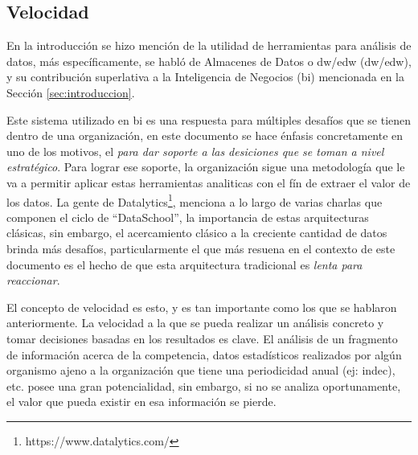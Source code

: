 \subsection{Velocidad} \label{ssec:velocidad}

En la introducción se hizo mención de la utilidad de herramientas para
análisis de datos, más específicamente, se habló de Almacenes de Datos o 
\acrlong{dw}/\acrlong{edw} (\acrshort{dw}/\acrshort{edw}), y su contribución
superlativa a la Inteligencia de Negocios (\acrshort{bi}) mencionada en la
Sección \ref{sec:introduccion}.

Este sistema utilizado en \acrshort{bi} es una respuesta para múltiples
desafíos que se tienen dentro de una organización\cite{datalytics2}, en este
documento se hace énfasis concretamente en uno de los motivos, el 
\textit{para dar soporte a las desiciones que se toman a nivel estratégico}.
Para lograr ese soporte, la organización 
sigue una metodología que le va a permitir aplicar estas herramientas
analiticas con el fín de extraer el valor de los datos. La gente de
Datalytics\footnote{https://www.datalytics.com/}, menciona a lo largo de varias
charlas que componen el ciclo de ``DataSchool'', la importancia de estas
arquitecturas clásicas, sin embargo, el acercamiento clásico a la creciente
cantidad de datos brinda más desafíos, particularmente el que más resuena en el
contexto de este documento es el hecho de que esta arquitectura tradicional es 
\textit{lenta para reaccionar}\cite{datalytics3}.

El concepto de velocidad es esto, y es tan importante como los que se hablaron
anteriormente. La velocidad a la que se pueda realizar un análisis concreto y
tomar decisiones basadas en los resultados es clave. El análisis de un
fragmento de información acerca de la competencia, datos estadísticos realizados
por algún organismo ajeno a la organización que tiene una periodicidad anual
(ej: \acrshort{indec}), etc. posee una gran potencialidad, sin embargo, si no
se analiza oportunamente, el valor que pueda existir en esa información se
pierde.


